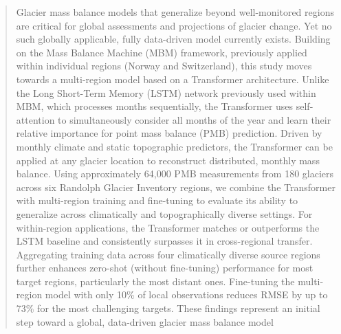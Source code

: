 \documentclass[draft]{agujournal2019}
\begin{document}

\begin{abstract}

Glacier mass balance models that generalize beyond well-monitored regions are critical for global assessments and projections of glacier change. Yet no such globally applicable, fully data-driven model currently exists. Building on the Mass Balance Machine (MBM) framework, previously applied within individual regions (Norway and Switzerland), this study moves towards a multi-region model based on a Transformer architecture. Unlike the Long Short-Term Memory (LSTM) network previously used within MBM, which processes months sequentially, the Transformer uses self-attention to simultaneously consider all months of the year and learn their relative importance for point mass balance (PMB) prediction. Driven by monthly climate and static topographic predictors, the Transformer can be applied at any glacier location to reconstruct distributed, monthly mass balance. Using approximately 64,000 PMB measurements from 180 glaciers across six Randolph Glacier Inventory regions, we combine the Transformer with multi-region training and fine-tuning to evaluate its ability to generalize across climatically and topographically diverse settings. For within-region applications, the Transformer matches or outperforms the LSTM baseline and consistently surpasses it in cross-regional transfer. Aggregating training data across four climatically diverse source regions further enhances zero-shot (without fine-tuning) performance for most target regions, particularly the most distant ones. Fine-tuning the multi-region model with only 10\% of local observations reduces RMSE by up to 73\% for the most challenging targets. These findings represent an initial step toward a global, data-driven glacier mass balance model



\end{abstract}
\end{document}
